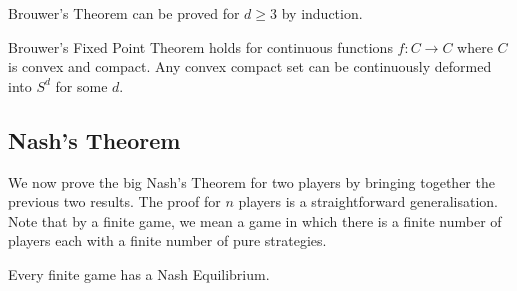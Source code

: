 \begin{claim}
	Brouwer's Theorem can be proved for $d \ge 3$ by induction.
\end{claim}

\begin{remark}
	Brouwer's Fixed Point Theorem holds for continuous functions $f:C
	\rightarrow C$ where $C$ is convex and compact. Any convex compact set can
	be continuously deformed into $S^d$ for some $d$.
\end{remark}

\subsection{Nash's Theorem}

We now prove the big Nash's Theorem for two players by bringing together the
previous two results. The proof for $n$ players is a straightforward
generalisation. Note that by a finite game, we mean a game in which there is a
finite number of players each with a finite number of pure strategies.

\begin{theorem}[Nash, 1951]
	Every finite game has a Nash Equilibrium.
\end{theorem}

